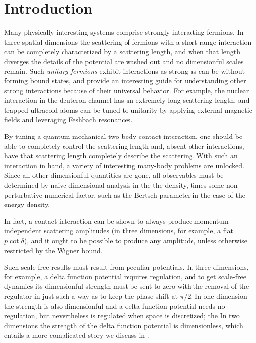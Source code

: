\section{Introduction}\label{sec:intro}

Many physically interesting systems comprise strongly-interacting fermions.
In three spatial dimensions the scattering of fermions with a short-range interaction can be completely characterized by a scattering length, and when that length diverges the details of the potential are washed out and no dimensionful scales remain.
Such \emph{unitary fermions} exhibit interactions as strong as can be without forming bound states, and provide an interesting guide for understanding other strong interactions because of their universal behavior.
For example, the nuclear interaction in the deuteron channel has an extremely long scattering length, and trapped ultracold atoms can be tuned to unitarity by applying external magnetic fields and leveraging Feshbach resonances.

By tuning a quantum-mechanical two-body contact interaction, one should be able to completely control the scattering length and, absent other interactions, have that scattering length completely describe the scattering.
With such an interaction in hand, a variety of interesting many-body problems are unlocked.
Since all other dimensionful quantities are gone, all observables must be determined by naive dimensional analysis in the the density, times some non-perturbative numerical factor, such as the Bertsch parameter\cite{} in the case of the energy density.

In fact, a contact interaction can be shown to always produce momentum-independent scattering amplitudes (in three dimensions, for example, a flat $p \cot \delta$), and it ought to be possible to produce any amplitude, unless otherwise restricted by the Wigner bound\cite{Wigner:1955zz,Phillips:1996ae,Hammer:2010fw}.

Such scale-free results must result from peculiar potentials.
In three dimensions, for example, a delta function potential requires regulation, and to get scale-free dynamics its dimensionful strength must be sent to zero with the removal of the regulator in just such a way as to keep the phase shift at $\pi/2$.
In one dimension the strength is also dimensionful and a delta function potential needs no regulation, but nevertheless is regulated when space is discretized; the
In two dimensions the strength of the delta function potential is dimensionless, which entails a more complicated story we discuss in .

